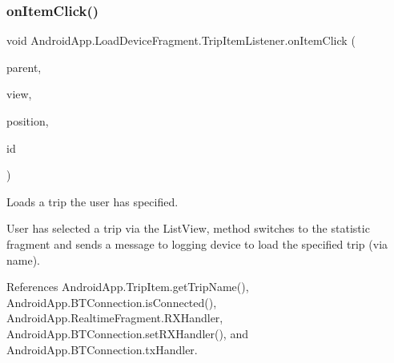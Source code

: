 \subsubsection{\texorpdfstring{on\+Item\+Click()}{onItemClick()}}
{\footnotesize\ttfamily void Android\+App.\+Load\+Device\+Fragment.\+Trip\+Item\+Listener.\+on\+Item\+Click (\begin{DoxyParamCaption}\item[{Adapter\+View$<$?$>$}]{parent,  }\item[{View}]{view,  }\item[{int}]{position,  }\item[{long}]{id }\end{DoxyParamCaption})\hspace{0.3cm}{\ttfamily [inline]}}



Loads a trip the user has specified. 

User has selected a trip via the List\+View, method switches to the statistic fragment and sends a message to logging device to load the specified trip (via name). 

References Android\+App.\+Trip\+Item.\+get\+Trip\+Name(), Android\+App.\+B\+T\+Connection.\+is\+Connected(), Android\+App.\+Realtime\+Fragment.\+R\+X\+Handler, Android\+App.\+B\+T\+Connection.\+set\+R\+X\+Handler(), and Android\+App.\+B\+T\+Connection.\+tx\+Handler.


